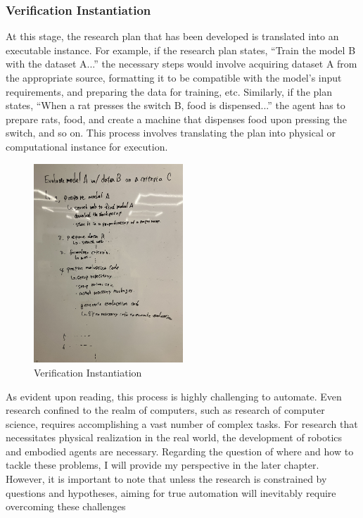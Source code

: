 \documentclass{article}
\begin{document}
\subsubsection{Verification Instantiation} 
At this stage, the research plan that has been developed is translated into an executable instance. For example, if the research plan states, ``Train the model B with the dataset A...'' the necessary steps would involve acquiring dataset A from the appropriate source, formatting it to be compatible with the model's input requirements, and preparing the data for training, etc. Similarly, if the plan states, ``When a rat presses the switch B, food is dispensed...'' the agent has to prepare rats, food, and create a machine that dispenses food upon pressing the switch, and so on. This process involves translating the plan into physical or computational instance for execution.

\begin{figure}[htb]
    \centering
    \includegraphics[width=0.5\textwidth]{figs/verification_instantiation.jpg}
    \caption{Verification Instantiation}
    \label{fig:verification_instantiation}
\end{figure}

As evident upon reading, this process is highly challenging to automate. Even research confined to the realm of computers, such as research of computer science, requires accomplishing a vast number of complex tasks. For research that necessitates physical realization in the real world, the development of robotics and embodied agents are necessary. Regarding the question of where and how to tackle these problems, I will provide my perspective in the later chapter. However, it is important to note that unless the research is constrained by questions and hypotheses, aiming for true automation will inevitably require overcoming these challenges
\end{document}
